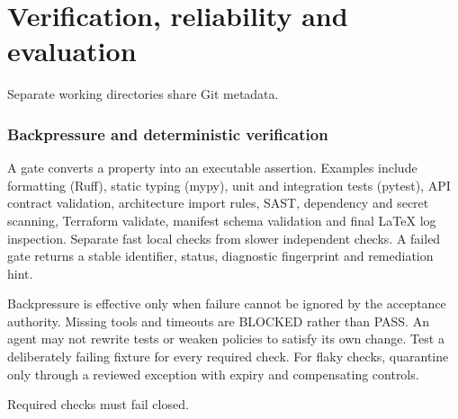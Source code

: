\documentclass[11pt,letterpaper]{article}
\begin{document}
\clearpage\part{Verification, reliability and evaluation}
\begin{center}\begin{minipage}{\linewidth}\captionsetup{type=figure}\centering{}\caption{Git worktree isolation}
\small Separate working directories share Git metadata.\end{minipage}\end{center}
\section{Backpressure and deterministic verification}
A gate converts a property into an executable assertion. Examples include formatting (Ruff), static typing (mypy), unit and integration tests (pytest), API contract validation, architecture import rules, SAST, dependency and secret scanning, Terraform validate, manifest schema validation and final LaTeX log inspection. Separate fast local checks from slower independent checks. A failed gate returns a stable identifier, status, diagnostic fingerprint and remediation hint.

Backpressure is effective only when failure cannot be ignored by the acceptance authority. Missing tools and timeouts are BLOCKED rather than PASS. An agent may not rewrite tests or weaken policies to satisfy its own change. Test a deliberately failing fixture for every required check. For flaky checks, quarantine only through a reviewed exception with expiry and compensating controls.

\begin{center}\begin{minipage}{\linewidth}\captionsetup{type=figure}\centering{}\caption{Deterministic verification pipeline}
\small Required checks must fail closed.\end{minipage}\end{center}
\end{document}
